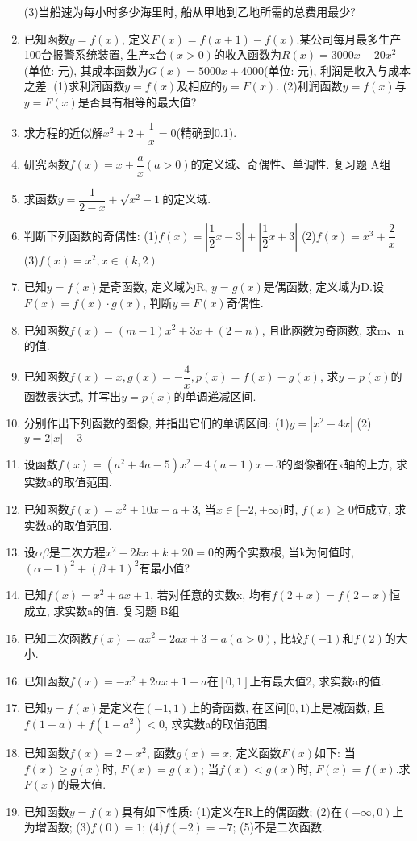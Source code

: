 \documentclass[10pt,a4paper]{article}
\begin{document}
\begin{enumerate}[1.]
(3)当船速为每小时多少海里时, 船从甲地到乙地所需的总费用最少?
\item 已知函数$y=f(x)$, 定义$F(x)=f(x+1)-f(x)$.某公司每月最多生产 100台报警系统装置, 生产x台$(x>0)$的收入函数为$R(x)=3000x-20x^2$(单位: 元), 其成本函数为$G(x)=5000x+4000$(单位: 元), 利润是收入与成本之差.
(1)求利润函数$y=f(x)$及相应的$y=F(x)$.
(2)利润函数$y=f(x)$与$y=F(x)$是否具有相等的最大值?
\item 求方程的近似解$x^2+2+\dfrac 1x=0$(精确到0.1).
\item 研究函数$f(x)=x+\dfrac ax(a>0)$的定义域、奇偶性、单调性.
复习题
A组
\item 求函数$y=\dfrac 1{2-x}+\sqrt {x^2-1}$的定义域.
\item 判断下列函数的奇偶性:
(1)$f(x)=|\dfrac 12x-3|+|\dfrac 12x+3|$				(2)$f(x)=x^3+\dfrac 2x$
(3)$f(x)=x^2,x\in (k,2)$
\item 已知$y=f(x)$是奇函数, 定义域为R, $y=g(x)$是偶函数, 定义域为D.设$F(x)=f(x)\cdot g(x)$, 判断$y=F(x)$奇偶性.
\item 已知函数$f(x)=(m-1)x^2+3x+(2-n)$, 且此函数为奇函数, 求m、n的值.
\item 已知函数$f(x)=x,g(x)=-\dfrac 4x,p(x)=f(x)-g(x)$, 求$y=p(x)$的函数表达式, 并写出$y=p(x)$的单调递减区间.
\item 分别作出下列函数的图像, 并指出它们的单调区间:
(1)$y=|x^2-4x|$							(2)$y=2|x|-3$
\item 设函数$f(x)=(a^2+4a-5)x^2-4(a-1)x+3$的图像都在x轴的上方, 求实数a的取值范围.
\item 已知函数$f(x)=x^2+10x-a+3$, 当$x\in [-2,+\infty)$时, $f(x)\ge 0$恒成立, 求实数a的取值范围.
\item 设$\alpha \beta$是二次方程$x^2-2kx+k+20=0$的两个实数根, 当k为何值时, $(\alpha +1)^2+(\beta +1)^2$有最小值?
\item 已知$f(x)=x^2+ax+1$, 若对任意的实数x, 均有$f(2+x)=f(2-x)$恒成立, 求实数a的值.
复习题
B组
\item 已知二次函数$f(x)=ax^2-2ax+3-a(a>0)$, 比较$f(-1)$和$f(2)$的大小.
\item 已知函数$f(x)=-x^2+2ax+1-a$在$[0,1]$上有最大值2, 求实数a的值.
\item 已知$y=f(x)$是定义在$(-1,1)$上的奇函数, 在区间$[0,1)$上是减函数, 且$f(1-a)+f(1-a^2)<0$, 求实数a的取值范围.
\item 已知函数$f(x)=2-x^2$, 函数$g(x)=x$, 定义函数$F(x)$如下: 当$f(x)\ge g(x)$时, $F(x)=g(x)$; 当$f(x)<g(x)$时, $F(x)=f(x)$.求$F(x)$的最大值.
\item 已知函数$y=f(x)$具有如下性质: (1)定义在R上的偶函数; (2)在$(-\infty ,0)$上为增函数; (3)$f(0)=1$; (4)$f(-2)=-7$; (5)不是二次函数.

\end{enumerate}
\end{document}
